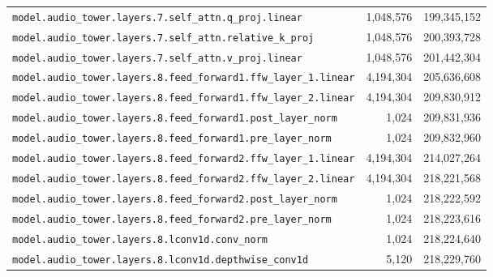 \documentclass[10pt,a4paper]{article}
\theoremstyle{definition}
\begin{document}
\begin{appendices}
\begin{longtable}{p{9.5cm}rr}
\texttt{model.\allowbreak{}audio\_tower.\allowbreak{}layers.\allowbreak{}7.\allowbreak{}self\_attn.\allowbreak{}q\_proj.\allowbreak{}linear} & 1,048,576 & 199,345,152 \\
\texttt{model.\allowbreak{}audio\_tower.\allowbreak{}layers.\allowbreak{}7.\allowbreak{}self\_attn.\allowbreak{}relative\_k\_proj} & 1,048,576 & 200,393,728 \\
\texttt{model.\allowbreak{}audio\_tower.\allowbreak{}layers.\allowbreak{}7.\allowbreak{}self\_attn.\allowbreak{}v\_proj.\allowbreak{}linear} & 1,048,576 & 201,442,304 \\
\texttt{model.\allowbreak{}audio\_tower.\allowbreak{}layers.\allowbreak{}8.\allowbreak{}feed\_forward1.\allowbreak{}ffw\_layer\_1.\allowbreak{}linear} & 4,194,304 & 205,636,608 \\
\texttt{model.\allowbreak{}audio\_tower.\allowbreak{}layers.\allowbreak{}8.\allowbreak{}feed\_forward1.\allowbreak{}ffw\_layer\_2.\allowbreak{}linear} & 4,194,304 & 209,830,912 \\
\texttt{model.\allowbreak{}audio\_tower.\allowbreak{}layers.\allowbreak{}8.\allowbreak{}feed\_forward1.\allowbreak{}post\_layer\_norm} & 1,024 & 209,831,936 \\
\texttt{model.\allowbreak{}audio\_tower.\allowbreak{}layers.\allowbreak{}8.\allowbreak{}feed\_forward1.\allowbreak{}pre\_layer\_norm} & 1,024 & 209,832,960 \\
\texttt{model.\allowbreak{}audio\_tower.\allowbreak{}layers.\allowbreak{}8.\allowbreak{}feed\_forward2.\allowbreak{}ffw\_layer\_1.\allowbreak{}linear} & 4,194,304 & 214,027,264 \\
\texttt{model.\allowbreak{}audio\_tower.\allowbreak{}layers.\allowbreak{}8.\allowbreak{}feed\_forward2.\allowbreak{}ffw\_layer\_2.\allowbreak{}linear} & 4,194,304 & 218,221,568 \\
\texttt{model.\allowbreak{}audio\_tower.\allowbreak{}layers.\allowbreak{}8.\allowbreak{}feed\_forward2.\allowbreak{}post\_layer\_norm} & 1,024 & 218,222,592 \\
\texttt{model.\allowbreak{}audio\_tower.\allowbreak{}layers.\allowbreak{}8.\allowbreak{}feed\_forward2.\allowbreak{}pre\_layer\_norm} & 1,024 & 218,223,616 \\
\texttt{model.\allowbreak{}audio\_tower.\allowbreak{}layers.\allowbreak{}8.\allowbreak{}lconv1d.\allowbreak{}conv\_norm} & 1,024 & 218,224,640 \\
\texttt{model.\allowbreak{}audio\_tower.\allowbreak{}layers.\allowbreak{}8.\allowbreak{}lconv1d.\allowbreak{}depthwise\_conv1d} & 5,120 & 218,229,760 \\

\end{longtable}
\end{appendices}
\end{document}
